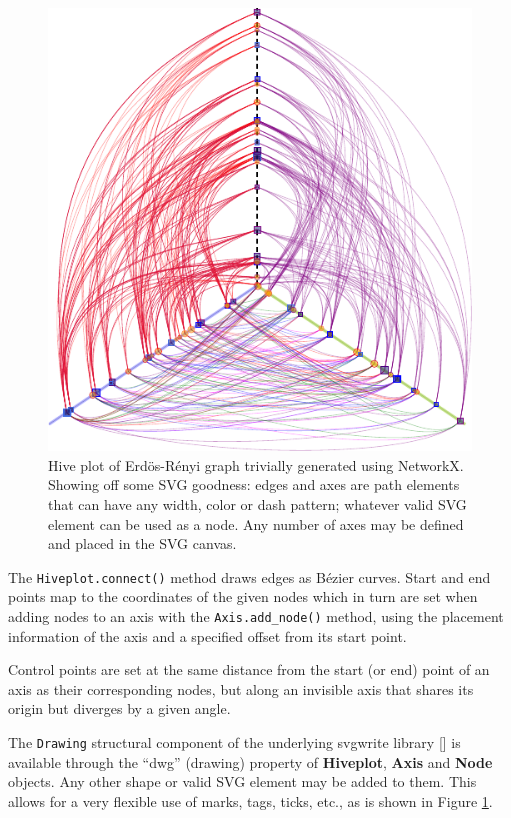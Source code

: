\documentclass{bioinfo}
\begin{document}
\begin{figure}[th!]
  \centerline{\includegraphics[scale=0.8]{example.pdf}}
  \caption{Hive plot of Erd\"os-R\'enyi graph trivially generated
    using NetworkX. Showing off some SVG goodness: edges and axes are
    path elements that can have any width, color or dash pattern;
    whatever valid SVG element can be used as a node. Any number of
    axes may be defined and placed in the SVG canvas.}
  \label{fig:01}
\end{figure}


The \verb"Hiveplot.connect()" method draws edges as B\'ezier curves.
Start and end points map to the coordinates of the given nodes which
in turn are set when adding nodes to an axis with the
\verb"Axis.add_node()" method, using the placement information of the
axis and a specified offset from its start point.

Control points are set at the same distance from the start (or end)
point of an axis as their corresponding nodes, but along an invisible
axis that shares its origin but diverges by a given angle.

The \verb"Drawing" structural component of the underlying svgwrite
library [\cite{svgwrite}] is available through the ``dwg'' (drawing)
property of {\bfseries Hiveplot}, {\bfseries Axis} and {\bfseries
  Node} objects. Any other shape or valid SVG element may be added to
them. This allows for a very flexible use of marks, tags, ticks, etc.,
as is shown in Figure \ref{fig:01}.
\end{document}
